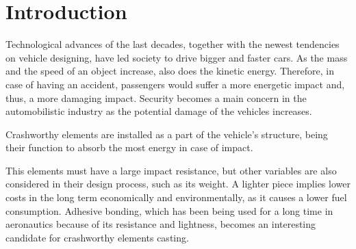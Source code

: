 \chapter{Introduction}
\label{Chapter0}


Technological advances of the last decades, together with the newest tendencies on vehicle designing, have led society to drive bigger and faster cars. As the mass and the speed of an object increase, also does the kinetic energy. Therefore, in case of having an accident, passengers would suffer a more energetic impact and, thus, a more damaging impact. Security becomes a main concern in the automobilistic industry as the potential damage of the vehicles increases.

Crashworthy elements are installed as a part of the vehicle's structure, being their function to absorb the most energy in case of impact.

This elements must have a large impact resistance, but other variables are also considered in their design process, such as its weight. A lighter piece implies lower costs in the long term economically and environmentally, as it causes a lower fuel consumption. Adhesive bonding, which has been being used for a long time in aeronautics because of its resistance and lightness, becomes an interesting candidate for crashworthy elements casting.